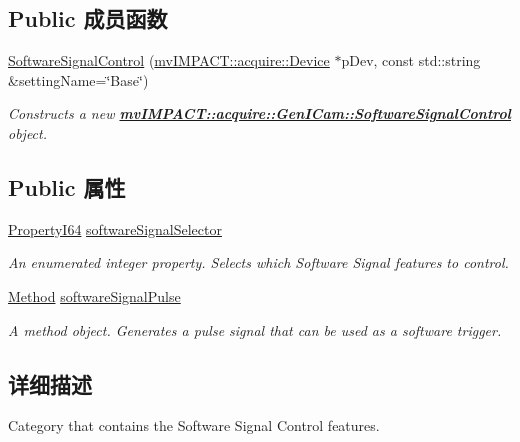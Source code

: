 \subsection*{Public 成员函数}
\begin{DoxyCompactItemize}
\item 
\hyperlink{classmv_i_m_p_a_c_t_1_1acquire_1_1_gen_i_cam_1_1_software_signal_control_a3e52bba0ee1a97727f77a7cf504528ff}{Software\+Signal\+Control} (\hyperlink{classmv_i_m_p_a_c_t_1_1acquire_1_1_device}{mv\+I\+M\+P\+A\+C\+T\+::acquire\+::\+Device} $\ast$p\+Dev, const std\+::string \&setting\+Name=\char`\"{}Base\char`\"{})
\begin{DoxyCompactList}\small\item\em Constructs a new {\bfseries \hyperlink{classmv_i_m_p_a_c_t_1_1acquire_1_1_gen_i_cam_1_1_software_signal_control}{mv\+I\+M\+P\+A\+C\+T\+::acquire\+::\+Gen\+I\+Cam\+::\+Software\+Signal\+Control}} object. \end{DoxyCompactList}\end{DoxyCompactItemize}
\subsection*{Public 属性}
\begin{DoxyCompactItemize}
\item 
\hyperlink{group___common_interface_ga81749b2696755513663492664a18a893}{Property\+I64} \hyperlink{classmv_i_m_p_a_c_t_1_1acquire_1_1_gen_i_cam_1_1_software_signal_control_a99efd63a4cd4ac8f175a3dce479095fc}{software\+Signal\+Selector}
\begin{DoxyCompactList}\small\item\em An enumerated integer property. Selects which Software Signal features to control. \end{DoxyCompactList}\item 
\hyperlink{classmv_i_m_p_a_c_t_1_1acquire_1_1_method}{Method} \hyperlink{classmv_i_m_p_a_c_t_1_1acquire_1_1_gen_i_cam_1_1_software_signal_control_a143f6e56fee1cb62e4140974790ba247}{software\+Signal\+Pulse}
\begin{DoxyCompactList}\small\item\em A method object. Generates a pulse signal that can be used as a software trigger. \end{DoxyCompactList}\end{DoxyCompactItemize}


\subsection{详细描述}
Category that contains the Software Signal Control features. 


